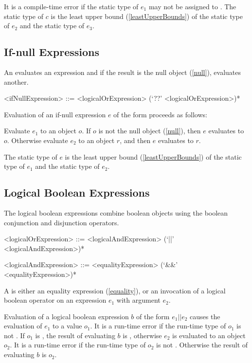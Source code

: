 \documentclass[makeidx]{article}
\begin{document}
\LMHash{}%
It is a compile-time error if the static type of $e_1$ may not be assigned to .
The static type of $c$ is the least upper bound (\ref{leastUpperBounds}) of the static type of $e_2$ and the static type of $e_3$.


\subsection{If-null Expressions}

\LMHash{}%
An  evaluates an expression and if the result is the null object (\ref{null}), evaluates another.

\begin{grammar}
<ifNullExpression> ::= <logicalOrExpression> (`??' <logicalOrExpression>)*
\end{grammar}

\LMHash{}%
Evaluation of an if-null expression $e$ of the form 
proceeds as follows:

\LMHash{}%
Evaluate $e_1$ to an object $o$.
If $o$ is not the null object (\ref{null}), then $e$ evaluates to $o$.
Otherwise evaluate $e_2$ to an object $r$,
and then $e$ evaluates to $r$.

\LMHash{}%
The static type of $e$ is the least upper bound (\ref{leastUpperBounds}) of the static type of $e_1$ and the static type of $e_2$.


\subsection{Logical Boolean Expressions}

\LMHash{}%
The logical boolean expressions combine boolean objects using the boolean conjunction and disjunction operators.

\begin{grammar}
<logicalOrExpression> ::= \gnewline{}
  <logicalAndExpression> (`||' <logicalAndExpression>)*

<logicalAndExpression> ::= <equalityExpression> (`\&\&' <equalityExpression>)*
\end{grammar}

\LMHash{}%
A  is either an equality expression (\ref{equality}), or an invocation of a logical boolean operator on an expression $e_1$ with argument $e_2$.

\LMHash{}%
Evaluation of a logical boolean expression $b$ of the form $e_1 || e_2$ causes the evaluation of $e_1$ to a value $o_1$.
It is a run-time error if the run-time type of $o_1$ is not .
If $o_1$ is \TRUE, the result of evaluating $b$ is \TRUE, otherwise $e_2$ is evaluated to an object $o_2$.
It is a run-time error if the run-time type of $o_2$ is not .
Otherwise the result of evaluating $b$ is $o_2$.
\end{document}

